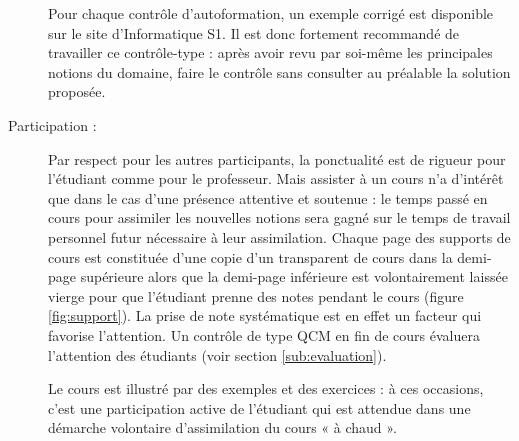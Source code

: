\begin{description}
	Pour chaque contrôle d'autoformation, un exemple corrigé est
	disponible sur le site d'Informatique S1. Il est donc fortement 
	recommandé de travailler ce contrôle-type : après avoir revu
	par soi-même les principales notions du domaine, faire
	le contrôle sans consulter au préalable la solution proposée. 
\item[Participation :] Par respect pour les autres participants, 
	la ponctualité est de rigueur pour l'étudiant comme pour le professeur.
	Mais assister à un cours n'a d'intérêt que dans le cas d'une 
	présence attentive et soutenue : le temps passé en cours 
	pour assimiler les nouvelles notions sera gagné sur le temps de
	travail personnel futur nécessaire à leur assimilation.
	Chaque page des supports de cours est constituée
	d'une copie d'un transparent de cours dans la demi-page supérieure
	alors que la demi-page inférieure est volontairement laissée vierge
	pour que l'étudiant prenne des notes pendant le cours (figure \ref{fig:support}).
	La prise de note systématique est en effet un facteur qui favorise l'attention.
	Un contrôle de type QCM en fin de cours évaluera l'attention
	des étudiants (voir section \ref{sub:evaluation}). 

	Le cours est illustré par des exemples et des exercices : à ces occasions, 
	c'est une participation active de l'étudiant qui est attendue dans une
	démarche volontaire d'assimilation du cours « à chaud ».
	

\end{description}
